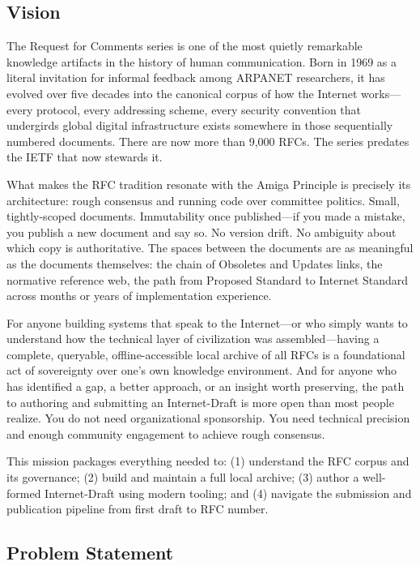 \documentclass[11pt,letterpaper]{article}
\begin{document}
\subsection{Vision}

The Request for Comments series is one of the most quietly remarkable knowledge artifacts in the history of human communication. Born in 1969 as a literal invitation for informal feedback among ARPANET researchers, it has evolved over five decades into the canonical corpus of how the Internet works---every protocol, every addressing scheme, every security convention that undergirds global digital infrastructure exists somewhere in those sequentially numbered documents. There are now more than 9,000 RFCs. The series predates the IETF that now stewards it.

What makes the RFC tradition resonate with the Amiga Principle is precisely its architecture: rough consensus and running code over committee politics. Small, tightly-scoped documents. Immutability once published---if you made a mistake, you publish a new document and say so. No version drift. No ambiguity about which copy is authoritative. The spaces between the documents are as meaningful as the documents themselves: the chain of Obsoletes and Updates links, the normative reference web, the path from Proposed Standard to Internet Standard across months or years of implementation experience.

For anyone building systems that speak to the Internet---or who simply wants to understand how the technical layer of civilization was assembled---having a complete, queryable, offline-accessible local archive of all RFCs is a foundational act of sovereignty over one's own knowledge environment. And for anyone who has identified a gap, a better approach, or an insight worth preserving, the path to authoring and submitting an Internet-Draft is more open than most people realize. You do not need organizational sponsorship. You need technical precision and enough community engagement to achieve rough consensus.

This mission packages everything needed to: (1) understand the RFC corpus and its governance; (2) build and maintain a full local archive; (3) author a well-formed Internet-Draft using modern tooling; and (4) navigate the submission and publication pipeline from first draft to RFC number.

\subsection{Problem Statement}
\end{document}
